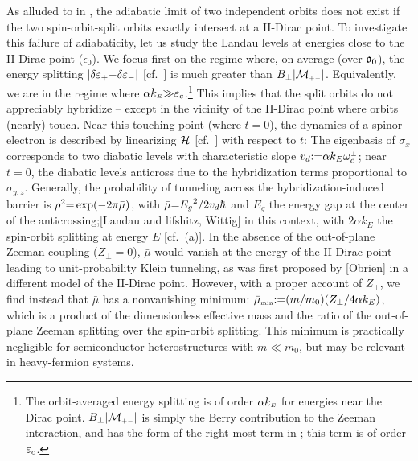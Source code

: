 \documentclass[aps, prb, showpacs, twocolumn, notitlepage, superscriptaddress]{revtex4-1}
\begin{document}
As alluded to in , the adiabatic limit of two independent orbits does not exist if the two spin-orbit-split orbits exactly intersect at a II-Dirac point. To investigate this failure of adiabaticity, let us study the Landau levels at energies close to the II-Dirac point ($\epsilon_0$). We focus first on the regime where, on average (over $\mathfrak{o}_0$), the energy splitting $|\delta \varepsilon_+{-}\delta \varepsilon_-|$ [cf.\ ] is much greater than $B_\perp|{\cal M}_{\scriptscriptstyle{+-}}|$. Equivalently, we are in the regime where $\alpha k_{\scriptscriptstyle{E}}{\gg}\varepsilon_c$.\footnote{The orbit-averaged energy splitting is of order $\alpha k_{\scriptscriptstyle{E}}$ for energies near the Dirac point. $B_\perp|{\cal M}_{\scriptscriptstyle{+-}}|$ is simply the Berry contribution to the Zeeman interaction, and has the form of the right-most term in ; this term is of order $\varepsilon_c$.} This implies that the split orbits do not appreciably hybridize -- except in the vicinity of the II-Dirac point where orbits (nearly) touch.  Near this touching point (where $t{=}0$), the dynamics of a spinor electron is described by linearizing $\mathcal{H}$ [cf.\ ] with respect to $t$:
The eigenbasis of $\sigma_x$ corresponds to two diabatic levels with characteristic slope $v_d{:}{=}\alpha k_E\omega^{\scriptscriptstyle{\perp}}_c$; near $t{=}0$, the diabatic levels anticross  due to the hybridization terms proportional to $\sigma_{y,z}$. Generally, the probability of tunneling across the hybridization-induced barrier is  $\rho^2{=}\exp(-2\pi\bar{\mu})$, with $\bar{\mu}{=}{E_g}^2/{2v_d \hbar}$ and $E_g$ the energy gap at the center of the anticrossing;[Landau and lifshitz, Wittig] in this context,
with $2\alpha k_E$ the spin-orbit splitting at energy $E$ [cf.\ (a)]. In the absence of the out-of-plane Zeeman coupling ($Z_\perp{=}0$), $\bar{\mu}$ would vanish at the energy of the II-Dirac point -- leading to unit-probability Klein tunneling, as was first proposed by [Obrien] in a different model of the II-Dirac point. However, with a proper account of $Z_\perp$, we find instead that $\bar{\mu}$ has a nonvanishing minimum: $\bar{\mu}_{\scriptscriptstyle{\text{min}}}{:}{=} ( m/m_0)(Z_\perp/4\alpha k_{E})$, which is a product of the dimensionless effective mass and the ratio of the out-of-plane Zeeman splitting over the spin-orbit splitting. This minimum is practically negligible for  semiconductor heterostructures with $m{\ll}m_0$, but may be relevant in heavy-fermion systems. 
\end{document}
